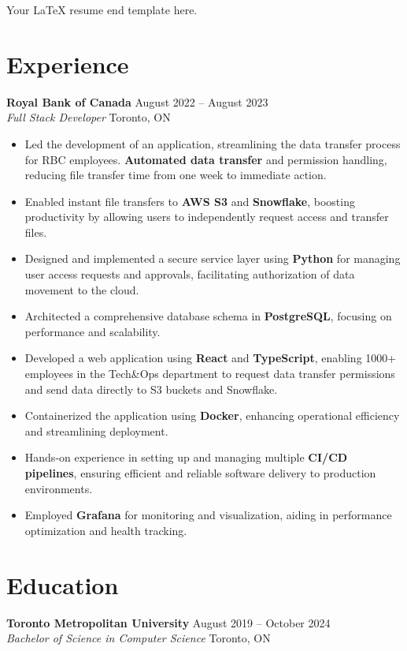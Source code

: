 Your LaTeX resume end template here.


\section*{Experience}

\textbf{Royal Bank of Canada} \hfill August 2022 – August 2023 \\
\textit{Full Stack Developer} \hfill Toronto, ON
\begin{itemize}
    \item Led the development of an application, streamlining the data transfer process for RBC employees. \textbf{Automated data transfer} and permission handling, reducing file transfer time from one week to immediate action.
    \item Enabled instant file transfers to \textbf{AWS S3} and \textbf{Snowflake}, boosting productivity by allowing users to independently request access and transfer files.
    \item Designed and implemented a secure service layer using \textbf{Python} for managing user access requests and approvals, facilitating authorization of data movement to the cloud.
    \item Architected a comprehensive database schema in \textbf{PostgreSQL}, focusing on performance and scalability.
    \item Developed a web application using \textbf{React} and \textbf{TypeScript}, enabling 1000+ employees in the Tech\&Ops department to request data transfer permissions and send data directly to S3 buckets and Snowflake.
    \item Containerized the application using \textbf{Docker}, enhancing operational efficiency and streamlining deployment.
    \item Hands-on experience in setting up and managing multiple \textbf{CI/CD pipelines}, ensuring efficient and reliable software delivery to production environments.
    \item Employed \textbf{Grafana} for monitoring and visualization, aiding in performance optimization and health tracking.
\end{itemize}

\section*{Education}

\textbf{Toronto Metropolitan University} \hfill August 2019 – October 2024 \\
\textit{Bachelor of Science in Computer Science} \hfill Toronto, ON

